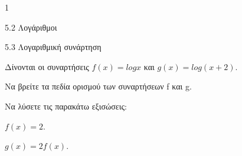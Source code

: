 \begin{ylh}{1}
\item 5.2 Λογάριθμοι
\item 5.3 Λογαριθμική συνάρτηση
\end{ylh}
Δίνονται οι συναρτήσεις $f(x) = logx$ και $g(x) = log(x + 2)$.
\begin{alist}
\item Να βρείτε τα πεδία ορισμού των συναρτήσεων f και g.
\item Να λύσετε τις παρακάτω εξισώσεις:
\begin{rlist}
\item $f(x) = 2.$
\item $g(x) = 2f(x).$
\end{rlist}
\end{alist}

